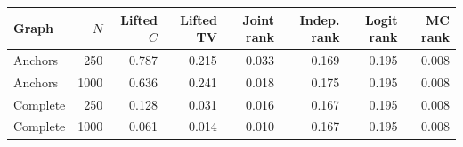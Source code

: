 \begin{tabular}{lrrrrrrr}
\toprule
Graph & $N$ & Lifted $C$ & Lifted TV & Joint rank & Indep. rank & Logit rank & MC rank \\
\midrule
Anchors & 250 & 0.787 & 0.215 & 0.033 & 0.169 & 0.195 & 0.008 \\
Anchors & 1000 & 0.636 & 0.241 & 0.018 & 0.175 & 0.195 & 0.008 \\
Complete & 250 & 0.128 & 0.031 & 0.016 & 0.167 & 0.195 & 0.008 \\
Complete & 1000 & 0.061 & 0.014 & 0.010 & 0.167 & 0.195 & 0.008 \\
\bottomrule
\end{tabular}
